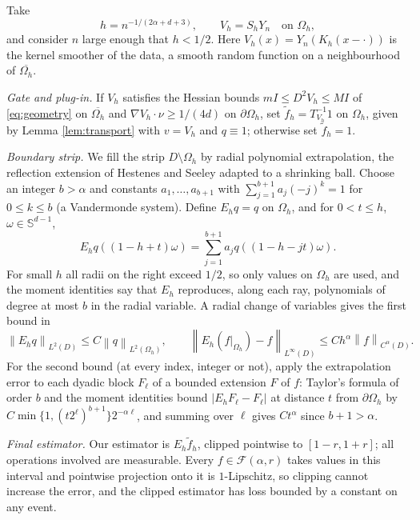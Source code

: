 \documentclass[11pt]{article}
\numberwithin{equation}{section}
\newcommand{\norm}[1]{\left\|#1\right\|}
\newcommand{\Sp}{\mathbb S^{d-1}}
\begin{document}
Take
\begin{equation}\label{eq:bandwidth}
 h=n^{-1/(2\alpha+d+3)},\qquad V_h=S_hY_n\quad\text{on }\Omega_h,
\end{equation}
and consider $n$ large enough that $h<1/2$. Here
$V_h(x)=Y_n(K_h(x-\cdot))$ is the kernel smoother of the data, a smooth
random function on a neighbourhood of $\overline{\Omega_h}$.

\emph{Gate and plug-in.} If $V_h$ satisfies the Hessian bounds
$mI\le D^2V_h\le MI$ of \eqref{eq:geometry} on $\overline{\Omega_h}$
and $\nabla V_h\cdot\nu\ge1/(4d)$ on $\partial\Omega_h$, set
$\widetilde f_h=T_{V_h}^{-1}1$ on $\Omega_h$, given by Lemma
\ref{lem:transport} with $v=V_h$ and $q\equiv1$; otherwise set
$\widetilde f_h=1$.

\emph{Boundary strip.} We fill the strip $D\setminus\Omega_h$ by radial
polynomial extrapolation, the reflection extension of Hestenes and
Seeley \cite{Hestenes,Seeley} adapted to a shrinking ball. Choose an
integer $b>\alpha$ and constants $a_1,\ldots,a_{b+1}$ with
$\sum_{j=1}^{b+1}a_j(-j)^k=1$ for $0\le k\le b$ (a Vandermonde system).
Define $E_hq=q$ on $\Omega_h$, and for $0<t\le h$, $\omega\in\Sp$,
\begin{equation}\label{eq:extension}
 E_hq((1-h+t)\omega)
       =\sum_{j=1}^{b+1}a_jq((1-h-jt)\omega).
\end{equation}
For small $h$ all radii on the right exceed $1/2$, so only values on
$\Omega_h$ are used, and the moment identities say that $E_h$
reproduces, along each ray, polynomials of degree at most $b$ in the
radial variable. A radial change of variables gives the first bound in
\begin{equation}\label{eq:extensionbounds}
 \norm{E_hq}_{L^2(D)}\le C\norm q_{L^2(\Omega_h)},\qquad
 \norm{E_h(f|_{\Omega_h})-f}_{L^\infty(D)}\le Ch^\alpha
       \norm f_{C^\alpha(D)} .
\end{equation}
For the second bound (at every index, integer or not), apply the
extrapolation error to each dyadic block $F_\ell$ of a bounded
extension $F$ of $f$: Taylor's formula of order $b$ and the moment
identities bound $|E_hF_\ell-F_\ell|$ at distance $t$ from
$\partial\Omega_h$ by $C\min\{1,(t2^\ell)^{b+1}\}2^{-\alpha\ell}$, and
summing over $\ell$ gives $Ct^\alpha$ since $b+1>\alpha$.

\emph{Final estimator.} Our estimator is $E_h\widetilde f_h$, clipped
pointwise to $[1-r,1+r]$; all operations involved are measurable.
Every $f\in\mathcal F(\alpha,r)$ takes values in this interval and
pointwise projection onto it is $1$-Lipschitz, so clipping cannot
increase the error, and the clipped estimator has loss bounded by a
constant on any event.
\end{document}
